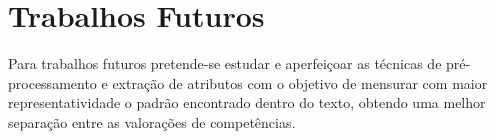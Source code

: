 \section{Trabalhos Futuros}

Para trabalhos futuros pretende-se estudar e aperfeiçoar as técnicas de 
pré-processamento e extração de atributos com o objetivo de mensurar com maior 
representatividade o padrão encontrado dentro do texto, obtendo uma melhor 
separação entre as valorações de competências.